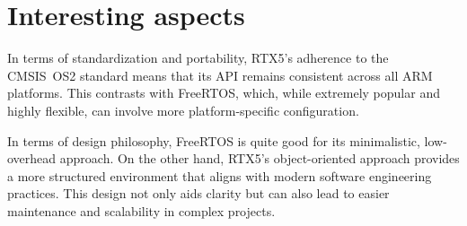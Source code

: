 \section*{Interesting aspects}

In terms of standardization and portability, RTX5’s adherence to the CMSIS OS2 standard means that its API remains consistent across all ARM platforms.
This contrasts with FreeRTOS, which, while extremely popular and highly flexible, can involve more platform-specific configuration.

In terms of design philosophy, FreeRTOS is quite good for its minimalistic, low-overhead approach.
On the other hand, RTX5’s object-oriented approach provides a more structured environment that aligns with modern software engineering practices. This design not only aids clarity but can also lead to easier maintenance and scalability in complex projects.

